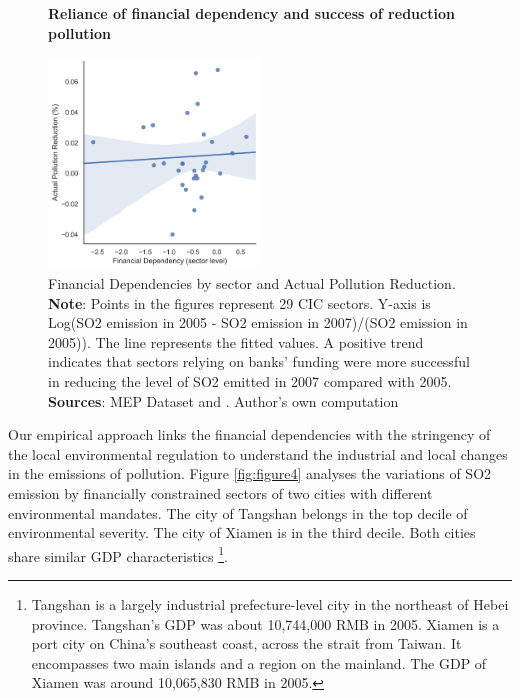 \documentclass[12pt]{article}
\begin{document}
\begin{figure}[ht]
    \centering
    \textbf{Reliance of financial dependency and success of reduction pollution}\par\medskip
    \includegraphics[width=0.5\textwidth]{fig_3.jpg}
    \caption{
    \small
    Financial Dependencies by sector and Actual Pollution Reduction.
    \textbf{Note}: Points in the figures represent 29 CIC sectors. Y-axis is Log(SO2 emission in 2005 - SO2 emission in 2007)/(SO2 emission in 2005)). The line represents the fitted values. A positive trend indicates that sectors relying on banks’ funding were more successful in reducing the level of SO2 emitted in 2007 compared with 2005. \\
    \textbf{Sources}: MEP Dataset and \cite{Fan2015-bm}. Author's own computation}
    \label{fig:figure3}
\end{figure}

Our empirical approach links the financial dependencies with the stringency of the local environmental regulation to understand the industrial and local changes in the emissions of pollution. Figure \ref{fig:figure4} analyses the variations of SO2 emission by financially constrained sectors of two cities with different environmental mandates. The city of Tangshan belongs in the top decile of environmental severity. The city of Xiamen is in the third decile. Both cities share similar GDP characteristics \footnote{Tangshan is a largely industrial prefecture-level city in the northeast of Hebei province. Tangshan’s GDP was about 10,744,000 RMB in 2005. Xiamen is a port city on China’s southeast coast, across the strait from Taiwan. It encompasses two main islands and a region on the mainland. The GDP of Xiamen was around 10,065,830 RMB in 2005.}.
\end{document}
